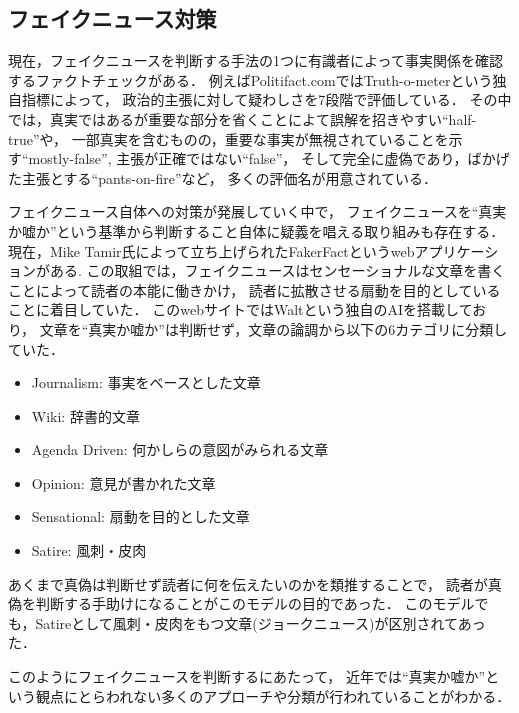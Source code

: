 \subsection{フェイクニュース対策}
現在，フェイクニュースを判断する手法の1つに有識者によって事実関係を確認するファクトチェックがある．
例えばPolitifact.comではTruth-o-meterという独自指標によって，
政治的主張に対して疑わしさを7段階で評価\cite{holan_2018}している．
その中では，真実ではあるが重要な部分を省くことによて誤解を招きやすい``half-true''や，
一部真実を含むものの，重要な事実が無視されていることを示す``mostly-false'',
主張が正確ではない``false''，
そして完全に虚偽であり，ばかげた主張とする``pants-on-fire''など，
多くの評価名が用意されている．

フェイクニュース自体への対策が発展していく中で，
フェイクニュースを``真実か嘘か''という基準から判断すること自体に疑義を唱える取り組みも存在する．
現在，Mike Tamir氏によって立ち上げられたFakerFactというwebアプリケーションがある\cite{tamir}.
この取組では，フェイクニュースはセンセーショナルな文章を書くことによって読者の本能に働きかけ，
読者に拡散させる扇動を目的としていることに着目していた．
このwebサイトではWaltという独自のAIを搭載しており，
文章を``真実か嘘か''は判断せず，文章の論調から以下の6カテゴリに分類していた．

\begin{itemize}
    \item Journalism: 事実をベースとした文章
    \item Wiki: 辞書的文章
    \item Agenda Driven: 何かしらの意図がみられる文章
    \item Opinion: 意見が書かれた文章
    \item Sensational: 扇動を目的とした文章
    \item Satire: 風刺・皮肉
\end{itemize}

あくまで真偽は判断せず読者に何を伝えたいのかを類推することで，
読者が真偽を判断する手助けになることがこのモデルの目的であった．
このモデルでも，Satireとして風刺・皮肉をもつ文章(ジョークニュース)が区別されてあった．

このようにフェイクニュースを判断するにあたって，
近年では``真実か嘘か''という観点にとらわれない多くのアプローチや分類が行われていることがわかる．
